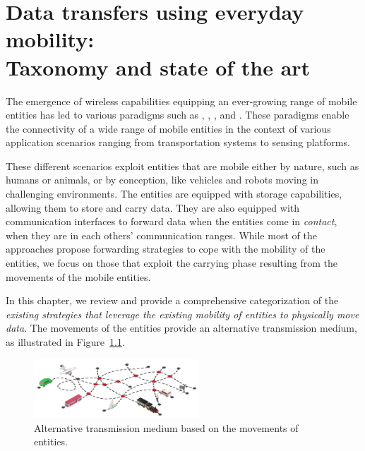 \chapter[Data transfers using everyday mobility: Taxonomy and state of the art]{Data transfers using everyday mobility:\\[-5pt] Taxonomy and state of the art}
\label{cha:state-of-the-art}

The emergence of wireless capabilities equipping an ever-growing range of mobile entities has led to various paradigms such as , , , and . These paradigms enable the connectivity of a wide range of mobile entities in the context of various application scenarios ranging from transportation systems to sensing platforms. 

These different scenarios exploit entities that are mobile either by nature, such as humans or animals, or by conception, like vehicles and robots moving in challenging environments. The entities are equipped with storage capabilities, allowing them to store and carry data. They are also equipped with communication interfaces to forward data when the entities come in \textit{contact}, \ie when they are in each others' communication ranges. While most of the approaches propose forwarding strategies to cope with the mobility of the entities, we focus on those that exploit the carrying phase resulting from the movements of the mobile entities. 

In this chapter, we review and provide a comprehensive categorization of the \textit{existing strategies that leverage the existing mobility of entities to physically move data}. The movements of the entities provide an alternative transmission medium, as illustrated in Figure~\ref{fig:related-work}.

\begin{figure}[h]
    \vspace{-10pt}
    \centering
    \includegraphics[width=0.55\textwidth]{figures/related-workv3.pdf}
    \vspace{-10pt}
    \caption{Alternative transmission medium based on the movements of entities.}
    \label{fig:related-work}
\end{figure}

